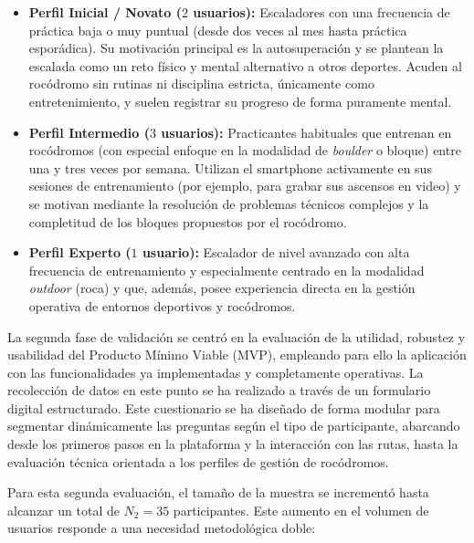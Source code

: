\begin{itemize}
    \item \textbf{Perfil Inicial / Novato ($2$ usuarios):} Escaladores con una frecuencia de práctica baja o muy puntual (desde dos veces al mes hasta práctica esporádica). Su motivación principal es la autosuperación y se plantean la escalada como un reto físico y mental alternativo a otros deportes. Acuden al rocódromo sin rutinas ni disciplina estricta, únicamente como entretenimiento, y suelen registrar su progreso de forma puramente mental.
    \item \textbf{Perfil Intermedio ($3$ usuarios):} Practicantes habituales que entrenan en rocódromos (con especial enfoque en la modalidad de \textit{boulder} o bloque) entre una y tres veces por semana. Utilizan el smartphone activamente en sus sesiones de entrenamiento (por ejemplo, para grabar sus ascensos en video) y se motivan mediante la resolución de problemas técnicos complejos y la completitud de los bloques propuestos por el rocódromo.
    \item \textbf{Perfil Experto ($1$ usuario):} Escalador de nivel avanzado con alta frecuencia de entrenamiento y especialmente centrado en la modalidad \textit{outdoor} (roca) y que, además, posee experiencia directa en la gestión operativa de entornos deportivos y rocódromos.
\end{itemize}

La segunda fase de validación se centró en la evaluación de la utilidad, robustez y usabilidad del Producto Mínimo Viable (MVP), empleando para ello la aplicación con las funcionalidades ya implementadas y completamente operativas. La recolección de datos en este punto se ha realizado a través de un formulario digital estructurado. Este cuestionario se ha diseñado de forma modular para segmentar dinámicamente las preguntas según el tipo de participante, abarcando desde los primeros pasos en la plataforma y la interacción con las rutas, hasta la evaluación técnica orientada a los perfiles de gestión de rocódromos.

Para esta segunda evaluación, el tamaño de la muestra se incrementó hasta alcanzar un total de $N_2 = 35$ participantes. Este aumento en el volumen de usuarios responde a una necesidad metodológica doble:

